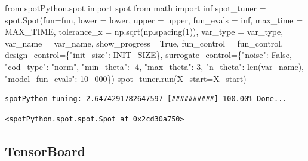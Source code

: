 \documentclass[
  letterpaper,
  DIV=11,
  numbers=noendperiod]{scrreprt}
\newenvironment{Shaded}{\begin{snugshade}}{\end{snugshade}}
\newcommand{\BuiltInTok}[1]{\textcolor[rgb]{0.00,0.23,0.31}{#1}}
\newcommand{\DecValTok}[1]{\textcolor[rgb]{0.68,0.00,0.00}{#1}}
\newcommand{\ImportTok}[1]{\textcolor[rgb]{0.00,0.46,0.62}{#1}}
\newcommand{\NormalTok}[1]{\textcolor[rgb]{0.00,0.23,0.31}{#1}}
\newcommand{\OperatorTok}[1]{\textcolor[rgb]{0.37,0.37,0.37}{#1}}
\newcommand{\StringTok}[1]{\textcolor[rgb]{0.13,0.47,0.30}{#1}}
\newcommand{\VariableTok}[1]{\textcolor[rgb]{0.07,0.07,0.07}{#1}}
\begin{document}
\begin{Shaded}
\begin{Highlighting}[]
\ImportTok{from}\NormalTok{ spotPython.spot }\ImportTok{import}\NormalTok{ spot}
\ImportTok{from}\NormalTok{ math }\ImportTok{import}\NormalTok{ inf}
\NormalTok{spot\_tuner }\OperatorTok{=}\NormalTok{ spot.Spot(fun}\OperatorTok{=}\NormalTok{fun,}
\NormalTok{                   lower }\OperatorTok{=}\NormalTok{ lower,}
\NormalTok{                   upper }\OperatorTok{=}\NormalTok{ upper,}
\NormalTok{                   fun\_evals }\OperatorTok{=}\NormalTok{ inf,}
\NormalTok{                   max\_time }\OperatorTok{=}\NormalTok{ MAX\_TIME,}
\NormalTok{                   tolerance\_x }\OperatorTok{=}\NormalTok{ np.sqrt(np.spacing(}\DecValTok{1}\NormalTok{)),}
\NormalTok{                   var\_type }\OperatorTok{=}\NormalTok{ var\_type,}
\NormalTok{                   var\_name }\OperatorTok{=}\NormalTok{ var\_name,}
\NormalTok{                   show\_progress}\OperatorTok{=} \VariableTok{True}\NormalTok{,}
\NormalTok{                   fun\_control }\OperatorTok{=}\NormalTok{ fun\_control,}
\NormalTok{                   design\_control}\OperatorTok{=}\NormalTok{\{}\StringTok{"init\_size"}\NormalTok{: INIT\_SIZE\},}
\NormalTok{                   surrogate\_control}\OperatorTok{=}\NormalTok{\{}\StringTok{"noise"}\NormalTok{: }\VariableTok{False}\NormalTok{,}
                                      \StringTok{"cod\_type"}\NormalTok{: }\StringTok{"norm"}\NormalTok{,}
                                      \StringTok{"min\_theta"}\NormalTok{: }\OperatorTok{{-}}\DecValTok{4}\NormalTok{,}
                                      \StringTok{"max\_theta"}\NormalTok{: }\DecValTok{3}\NormalTok{,}
                                      \StringTok{"n\_theta"}\NormalTok{: }\BuiltInTok{len}\NormalTok{(var\_name),}
                                      \StringTok{"model\_fun\_evals"}\NormalTok{: }\DecValTok{10\_000}\NormalTok{\})}
\NormalTok{spot\_tuner.run(X\_start}\OperatorTok{=}\NormalTok{X\_start)}
\end{Highlighting}
\end{Shaded}

\begin{verbatim}
spotPython tuning: 2.6474291782647597 [##########] 100.00% Done...
\end{verbatim}

\begin{verbatim}
<spotPython.spot.spot.Spot at 0x2cd30a750>
\end{verbatim}

\hypertarget{sec-tensorboard-10}{%
\subsection{TensorBoard}\label{sec-tensorboard-10}}
\end{document}
